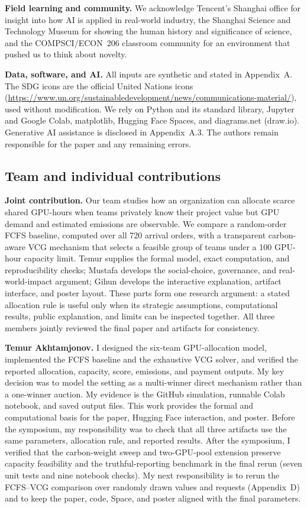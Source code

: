 \textbf{Field learning and community.} We acknowledge Tencent's Shanghai office for insight into how AI is applied in real-world industry, the Shanghai Science and Technology Museum for showing the human history and significance of science, and the COMPSCI/ECON~206 classroom community for an environment that pushed us to think about novelty.

\textbf{Data, software, and AI.} All inputs are synthetic and stated in Appendix~A. The SDG icons are the official United Nations icons (\url{https://www.un.org/sustainabledevelopment/news/communications-material/}), used without modification. We rely on Python and its standard library, Jupyter and Google Colab, matplotlib, Hugging Face Spaces, and diagrams.net (draw.io). Generative AI assistance is disclosed in Appendix~A.3. The authors remain responsible for the paper and any remaining errors.

\subsection*{Team and individual contributions}

\textbf{Joint contribution.} Our team studies how an organization can allocate scarce shared GPU-hours when teams privately know their project value but GPU demand and estimated emissions are observable. We compare a random-order FCFS baseline, computed over all 720 arrival orders, with a transparent carbon-aware VCG mechanism that selects a feasible group of teams under a 100 GPU-hour capacity limit. Temur supplies the formal model, exact computation, and reproducibility checks; Mustafa develops the social-choice, governance, and real-world-impact argument; Gihun develops the interactive explanation, artifact interface, and poster layout. These parts form one research argument: a stated allocation rule is useful only when its strategic assumptions, computational results, public explanation, and limits can be inspected together. All three members jointly reviewed the final paper and artifacts for consistency.

\textbf{Temur Akhtamjonov.} I designed the six-team GPU-allocation model, implemented the FCFS baseline and the exhaustive VCG solver, and verified the reported allocation, capacity, score, emissions, and payment outputs. My key decision was to model the setting as a multi-winner direct mechanism rather than a one-winner auction. My evidence is the GitHub simulation, runnable Colab notebook, and saved output files. This work provides the formal and computational basis for the paper, Hugging Face interaction, and poster. Before the symposium, my responsibility was to check that all three artifacts use the same parameters, allocation rule, and reported results. After the symposium, I verified that the carbon-weight sweep and two-GPU-pool extension preserve capacity feasibility and the truthful-reporting benchmark in the final rerun (seven unit tests and nine notebook checks). My next responsibility is to rerun the FCFS--VCG comparison over randomly drawn values and requests (Appendix~D) and to keep the paper, code, Space, and poster aligned with the final parameters.

